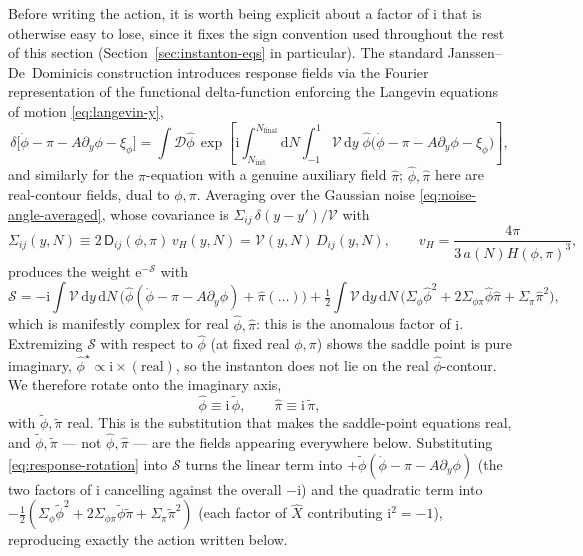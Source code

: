 \documentclass[a4paper,11pt]{article}
\renewcommand{\d}{\mathrm{d}}
\newcommand{\e}[1]{\mathrm{e}^{{#1}}}
\newcommand{\im}{\mathrm{i}}
\newcommand{\Dm}[1]{\mathcal{D}#1}            %
\newcommand{\Ny}{N}                          %
\newcommand{\Ninit}{N_{\mathrm{init}}}       %
\newcommand{\Nfinal}{N_{\mathrm{final}}}     %
\newcommand{\Hub}{H}                         %
\newcommand{\sfactor}{a}                     %
\newcommand{\atloc}{(\field,\mom)}           %
\newcommand{\field}{\phi}                    %
\newcommand{\mom}{\pi}                       %
\newcommand{\noise}[1]{\xi_{#1}}             %
\newcommand{\rfield}{\widetilde\field}       %
\newcommand{\rmom}{\widetilde\mom}           %
\newcommand{\yco}{y}                         %
\newcommand{\aHloc}{\sfactor(\Ny)\Hub\atloc} %
\newcommand{\advcoef}{A}                     %
\newcommand{\Dnoise}[1]{D_{#1}}              %
\newcommand{\Dcm}[1]{\mathsf{D}_{#1}}        %
\newcommand{\volel}{\mathcal{V}}             %
\newcommand{\Sigvol}[1]{\varSigma_{#1}}      %
\newcommand{\vH}{v_H}                        %
\begin{document}
Before writing the action, it is worth being explicit about a factor of
$\im$ that is otherwise easy to lose, since it fixes the sign convention
used throughout the rest of this section (Section~\ref{sec:instanton-eqs}
in particular). The standard Janssen--De~Dominicis construction introduces
response fields via the Fourier representation of the functional
delta-function enforcing the Langevin equations of motion
\eqref{eq:langevin-y},
\begin{equation}
    \delta\big[\dot\field-\mom-\advcoef\partial_\yco\field-\noise{\field}\big]
    =
    \int \Dm{\hat\field} \,
    \exp\!\left[\im\!\int_{\Ninit}^{\Nfinal}\!\!\d\Ny\int_{-1}^1\!\volel\,\d\yco\;
    \hat\field\big(\dot\field-\mom-\advcoef\partial_\yco\field-\noise{\field}\big)\right] ,
\end{equation}
and similarly for the $\mom$-equation with a genuine auxiliary field
$\hat\mom$; $\hat\field,\hat\mom$ here are real-contour fields, dual to
$\field,\mom$. Averaging over the Gaussian noise
\eqref{eq:noise-angle-averaged}, whose covariance is
$\Sigvol{ij}\,\delta(\yco-\yco')/\volel$ with
\begin{equation}
    \Sigvol{ij}(\yco,\Ny) \equiv 2\,\Dcm{ij}\atloc\,\vH(\yco,\Ny) = \volel(\yco,\Ny)\,\Dnoise{ij}(\yco,\Ny) ,
    \qquad
    \vH = \frac{4\pi}{3\,\aHloc^3} ,
    \label{eq:Sigvol-definition}
\end{equation}
produces the weight $\e{-\mathcal S}$ with
\begin{equation}
    \mathcal S
    =
    -\im\!\int\!\volel\,\d\yco\,\d\Ny\,\big(\hat\field(\dot\field-\mom-\advcoef\partial_\yco\field)
    + \hat\mom(\ldots)\big)
    +
    \tfrac12\!\int\!\volel\,\d\yco\,\d\Ny\,\big(\Sigvol{\field}\hat\field^2 + 2\Sigvol{\field\mom}\hat\field\hat\mom + \Sigvol{\mom}\hat\mom^2\big) ,
\end{equation}
which is manifestly complex for real $\hat\field,\hat\mom$: this is the
anomalous factor of $\im$. Extremizing $\mathcal S$ with respect to
$\hat\field$ (at fixed real $\field,\mom$) shows the saddle point is pure
imaginary, $\hat\field^\star\propto\im\times(\text{real})$, so the
instanton does not lie on the real $\hat\field$-contour. We therefore
rotate onto the imaginary axis,
\begin{equation}
    \hat\field \equiv \im\,\rfield , \qquad \hat\mom \equiv \im\,\rmom ,
    \label{eq:response-rotation}
\end{equation}
with $\rfield,\rmom$ real. This is the substitution that makes the
saddle-point equations real, and $\rfield,\rmom$ --- not
$\hat\field,\hat\mom$ --- are the fields appearing everywhere below.
Substituting \eqref{eq:response-rotation} into $\mathcal S$ turns the
linear term into $+\rfield(\dot\field-\mom-\advcoef\partial_\yco\field)$
(the two factors of $\im$ cancelling against the overall $-\im$) and the
quadratic term into
$-\tfrac12(\Sigvol{\field}\rfield^2+2\Sigvol{\field\mom}\rfield\rmom+\Sigvol{\mom}\rmom^2)$
(each factor of $\hat X$ contributing $\im^2=-1$), reproducing exactly the
action written below.
\end{document}
